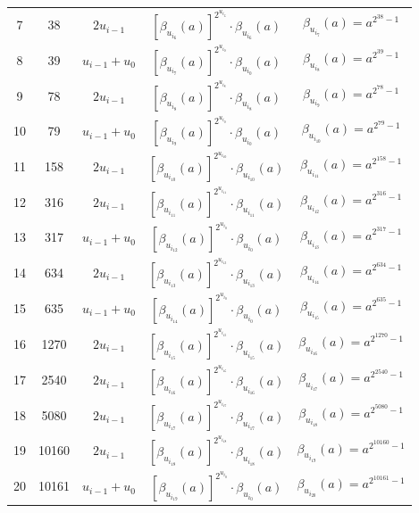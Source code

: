 \documentclass[runningheads]{llncs}
\begin{document}
\begin{table}[!tb]
\begin{tabular}{ccccc}
  7   & 38  & $2u_{i-1}$ &$[\beta_{u_{i_6}}(a)]^{2^{u_{i_6}}}\cdot \beta_{u_{i_6}}(a)$ & $\beta_{u_{i_7}}(a)=a^{2^{38}-1}$\\
  8   & 39  & $u_{i-1}+u_0$   &$[\beta_{u_{i_7}}(a)]^{2^{u_{i_0}}}\cdot \beta_{u_{i_0}}(a)$ & $\beta_{u_{i_8}}(a)=a^{2^{39}-1}$\\
  9   & 78  & $2u_{i-1}$ &$[\beta_{u_{i_8}}(a)]^{2^{u_{i_8}}}\cdot \beta_{u_{i_8}}(a)$ & $\beta_{u_{i_9}}(a)=a^{2^{78}-1}$\\
  10  & 79  & $u_{i-1}+u_0$   &$[\beta_{u_{i_9}}(a)]^{2^{u_{i_0}}}\cdot \beta_{u_{i_0}}(a)$ & $\beta_{u_{i_{10}}}(a)=a^{2^{79}-1}$\\
  11  & 158  & $2u_{i-1}$ &$[\beta_{u_{i_{10}}}(a)]^{2^{u_{i_{10}}}}\cdot \beta_{u_{i_{10}}}(a)$ & $\beta_{u_{i_{11}}}(a)=a^{2^{158}-1}$\\
  12  & 316  & $2u_{i-1}$ &$[\beta_{u_{i_{11}}}(a)]^{2^{u_{i_{11}}}}\cdot \beta_{u_{i_{11}}}(a)$ & $\beta_{u_{i_{12}}}(a)=a^{2^{316}-1}$\\
  13  & 317  & $u_{i-1}+u_0$   &$[\beta_{u_{i_{12}}}(a)]^{2^{u_{i_0}}}\cdot \beta_{u_{i_0}}(a)$ & $\beta_{u_{i_{13}}}(a)=a^{2^{317}-1}$\\
  14  & 634  & $2u_{i-1}$ &$[\beta_{u_{i_{13}}}(a)]^{2^{u_{i_{13}}}}\cdot \beta_{u_{i_{13}}}(a)$ & $\beta_{u_{i_{14}}}(a)=a^{2^{634}-1}$\\
  15  & 635  & $u_{i-1}+u_0$   &$[\beta_{u_{i_{14}}}(a)]^{2^{u_{i_0}}}\cdot \beta_{u_{i_0}}(a)$ & $\beta_{u_{i_{15}}}(a)=a^{2^{635}-1}$\\
  16  & 1270  & $2u_{i-1}$ &$[\beta_{u_{i_{15}}}(a)]^{2^{u_{i_{15}}}}\cdot \beta_{u_{i_{15}}}(a)$ & $\beta_{u_{i_{16}}}(a)=a^{2^{1270}-1}$\\
  17  & 2540  & $2u_{i-1}$ &$[\beta_{u_{i_{16}}}(a)]^{2^{u_{i_{16}}}}\cdot \beta_{u_{i_{16}}}(a)$ & $\beta_{u_{i_{17}}}(a)=a^{2^{2540}-1}$\\
  18  & 5080  & $2u_{i-1}$ &$[\beta_{u_{i_{17}}}(a)]^{2^{u_{i_{17}}}}\cdot \beta_{u_{i_{17}}}(a)$ & $\beta_{u_{i_{18}}}(a)=a^{2^{5080}-1}$\\
  19  & 10160 & $2u_{i-1}$ &$[\beta_{u_{i_{18}}}(a)]^{2^{u_{i_{18}}}}\cdot \beta_{u_{i_{18}}}(a)$ & $\beta_{u_{i_{19}}}(a)=a^{2^{10160}-1}$\\
  20  & 10161 & $u_{i-1}+u_0$ &$[\beta_{u_{i_{19}}}(a)]^{2^{u_{i_{0}}}}\cdot \beta_{u_{i_{0}}}(a)$ & $\beta_{u_{i_{20}}}(a)=a^{2^{10161}-1}$\\
  \hline
\end{tabular}
\end{table}
\end{document}
